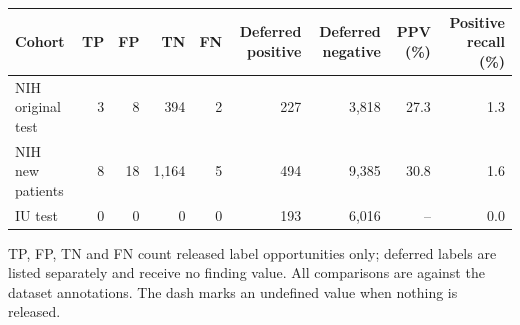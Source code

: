 \begin{tabular}{lrrrrrrrr}
\toprule
Cohort & TP & FP & TN & FN & Deferred positive & Deferred negative & PPV (\%) & Positive recall (\%)\\
\midrule
NIH original test & 3 & 8 & 394 & 2 & 227 & 3,818 & 27.3 & 1.3\\
NIH new patients & 8 & 18 & 1,164 & 5 & 494 & 9,385 & 30.8 & 1.6\\
IU test & 0 & 0 & 0 & 0 & 193 & 6,016 & -- & 0.0\\
\bottomrule
\end{tabular}\par\vspace{3pt}
\noindent\footnotesize TP, FP, TN and FN count released label opportunities only; deferred labels are listed separately and receive no finding value. All comparisons are against the dataset annotations. The dash marks an undefined value when nothing is released.
